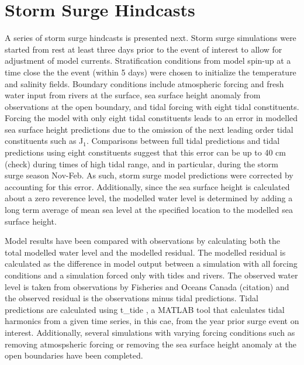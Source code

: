 \documentclass[pdftex,10pt]{article}
\begin{document}
\section{Storm Surge Hindcasts}\label{sec:storm}
A series of storm surge hindcasts is presented next. Storm surge simulations were started from rest at least three days prior to the event of interest to allow for adjustment of model currents. Stratification conditions from model spin-up at a time close the the event (within 5 days) were chosen to initialize the temperature and salinity fields. Boundary conditions include atmospheric forcing and fresh water input from rivers at the surface, sea surface height anomaly from observations at the open boundary, and tidal forcing with eight tidal constituents. Forcing the model with only eight tidal constituents leads to an error in modelled sea surface height predictions due to the omission of the next leading order tidal constituents such as J$_1$. Comparisons between full tidal predictions and tidal predictions using eight constituents suggest that this error can be up to 40 cm (check) during times of high tidal range, and in particular, during the storm surge season Nov-Feb. As such, storm surge model predictions were corrected by accounting for this error. Additionally, since the sea surface height is calculated about a zero reverence level, the modelled water level is determined by adding a long term average of mean sea level at the specified location to the modelled sea surface height.

Model results have been compared with observations by calculating both the total modelled water level and the modelled residual. The modelled residual is calculated as the difference in model output between a simulation with all forcing conditions and a simulation forced only with tides and rivers. The observed water level is taken from observations by Fisheries and Oceans Canada (citation) and the observed residual is the observations minus tidal predictions. Tidal predictions are calculated using t\_tide \citep{pawlowicz2002classical}, a MATLAB tool that calculates tidal harmonics from a given time series, in this cae, from the year prior surge event on interest. Additionally, several simulations with varying forcing conditions such as removing atmospsheric forcing or removing the sea surface height anomaly at the open boundaries have been completed. 
\end{document}
